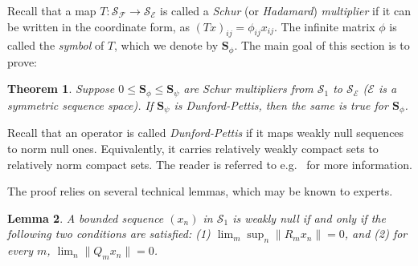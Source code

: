 \documentclass[12pt]{amsart}
\theoremstyle{plain}
\newtheorem{theorem}{Theorem}[subsection]
\newtheorem{lemma}[theorem]{Lemma}
\theoremstyle{definition}
\renewcommand{\leq}{\leqslant}
\newcommand{\schu}{\mathbf S}
\newcommand{\is}{\mathcal S}
\newcommand{\ce}{\mathcal E}
\newcommand{\se}{{\mathcal S}_{\mathcal{E}}}
\begin{document}
Recall that a map $T : \is_{\mathcal{F}} \to \se$ is called a
\emph{Schur} (or \emph{Hadamard}) \emph{multiplier} if it
can be written in the coordinate form, as $(T x)_{ij} = \phi_{ij} x_{ij}$.
The infinite matrix $\phi$ is called the \emph{symbol} of $T$,
which we denote by $\schu_\phi$. The main goal of this section
is to prove:

\begin{theorem}\label{thm:sch_mult}
Suppose $0 \leq \schu_\phi \leq \schu_\psi$ are Schur multipliers
from $\is_1$ to $\se$ ($\ce$ is a symmetric sequence space).
If $\schu_\psi$ is Dunford-Pettis, then
the same is true for $\schu_\phi$.
\end{theorem}

Recall that an operator is called \emph{Dunford-Pettis} if it maps weakly
null sequences to norm null ones. Equivalently, it carries relatively
weakly compact sets to relatively norm compact sets. The reader is referred
to e.g.~\cite[Section 5.4]{AB} for more information.

The proof relies on several technical lemmas, which may be known to experts.

\begin{lemma}\label{lem:w_null_l1}
A bounded sequence $(x_n)$ in $\is_1$ is weakly null if and only if the following
two conditions are satisfied: (1) $\lim_m \sup_n \|R_m x_n\| = 0$, and
(2) for every $m$, $\lim_n \|Q_m x_n\| = 0$.
\end{lemma}
\end{document}
